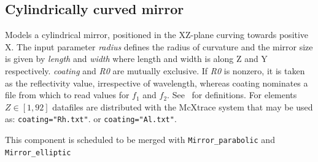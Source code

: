 \subsection*{Cylindrically curved mirror}

Models a cylindrical mirror, positioned in the XZ-plane curving towards
positive X. The input parameter \textit{radius} defines the radius of curvature
and the mirror size is given by \textit{length} and \textit{width} where length
and width is along Z and Y respectively. \textit{coating} and \textit{R0} are mutually
exclusive. If \textit{R0} is nonzero, it is taken as the reflectivity value,
irrespective of wavelength, whereas coating nominates a file from which to read
values for $f_1$ and $f_2$. See~\cite{NIST-ffast} for definitions. For
elements $Z\in[1,92]$ datafiles are distributed with the McXtrace system that
may be used as: \verb+coating="Rh.txt"+. or \verb+coating="Al.txt"+. 

This component is scheduled to be merged with \texttt{Mirror\_parabolic} and \texttt{Mirror\_elliptic} 

